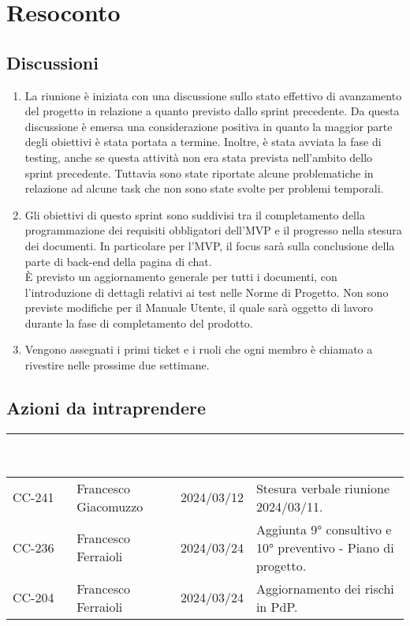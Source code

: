 \section{Resoconto} \label{sec:resoconto}
\subsection{Discussioni} \label{subsec:resdiscussione}
\begin{enumerate}
    \item La riunione è iniziata con una discussione sullo stato effettivo di avanzamento del progetto in relazione a quanto previsto dallo sprint precedente. Da questa discussione è emersa una considerazione positiva in quanto la maggior parte degli obiettivi è stata portata a termine. Inoltre, è stata avviata la fase di testing, anche se questa attività non era stata prevista nell'ambito dello sprint precedente.
    Tuttavia sono state riportate alcune problematiche in relazione ad alcune task che non sono state svolte per problemi temporali.

    \item Gli obiettivi di questo sprint sono suddivisi tra il completamento della programmazione dei requisiti obbligatori dell'MVP e il progresso nella stesura dei documenti. In particolare per l'MVP, il focus sarà sulla conclusione della parte di back-end della pagina di chat.\\
    È previsto un aggiornamento generale per tutti i documenti, con l'introduzione di dettagli relativi ai test nelle Norme di Progetto. Non sono previste modifiche per il Manuale Utente, il quale sarà oggetto di lavoro durante la fase di completamento del prodotto.
    \item Vengono assegnati i primi ticket e i ruoli che ogni membro è chiamato a rivestire nelle prossime due settimane.
\end{enumerate}

\subsection{Azioni da intraprendere}
{
    \setlength{\tabcolsep}{10pt}
            \renewcommand{\arraystretch}{1.5}
            \begin{xltabular}{\textwidth}{| l | l | l | X |}
                 \hline
                 \textbf{\textcolor{white}{Codice issue}} & \textbf{\textcolor{white}{Assegnatario}} & \textbf{\textcolor{white}{Scadenza}} & \textbf{\textcolor{white}{Descrizione}} \\
                 \hline
                 CC-241 & Francesco Giacomuzzo & 2024/03/12 & Stesura verbale riunione 2024/03/11.\\
                 \hline
                 CC-236 & Francesco Ferraioli & 2024/03/24 & Aggiunta 9° consultivo e 10° preventivo - Piano di progetto.\\
                 \hline
                 CC-204 & Francesco Ferraioli & 2024/03/24 & Aggiornamento dei rischi in PdP.\\
                 \hline
                 
            \end{xltabular}
}


